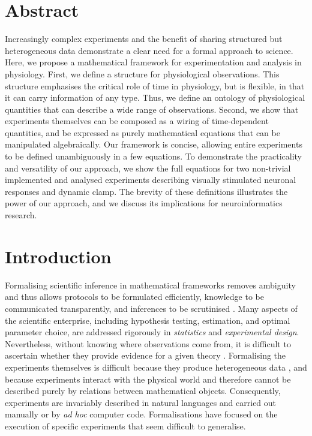 
\section*{Abstract}

Increasingly complex experiments and the benefit of sharing structured
but heterogeneous data demonstrate a clear need for a formal approach
to science.  Here, we propose a mathematical framework for
experimentation and analysis in physiology. First, we define a
structure for physiological observations. This structure emphasises
the critical role of time in physiology, but is flexible, in that it
can carry information of any type. Thus, we define an ontology of
physiological quantities that can describe a wide range of
observations. Second, we show that experiments themselves can be
composed as a wiring of time-dependent quantities, and be expressed as
purely mathematical equations that can be manipulated
algebraically. Our framework is concise, allowing entire experiments
to be defined unambiguously in a few equations. To demonstrate the
practicality and versatility of our approach, we show the full
equations for two non-trivial implemented and analysed experiments
describing visually stimulated neuronal responses and dynamic
clamp. The brevity of these definitions illustrates the power of our
approach, and we discuss its implications for neuroinformatics
research.

\section*{Introduction}

Formalising scientific inference in mathematical frameworks removes
ambiguity and thus allows protocols to be formulated efficiently,
knowledge to be communicated transparently, and inferences to be
scrutinised \citep{Soldatova2006, Jaynes2003, Krantz1971}. Many
aspects of the scientific enterprise, including hypothesis testing,
estimation, and optimal parameter choice, are addressed rigorously in
\emph{statistics} and \emph{experimental design}. Nevertheless,
without knowing where observations come from, it is difficult to
ascertain whether they provide evidence for a given theory
\citep{Pool2002,MacKenzie-Graham2008,VanHorn2009}. Formalising the
experiments themselves is difficult because they produce heterogeneous
data \citep{Tukey1962}, and because experiments interact with the
physical world and therefore cannot be described purely by relations
between mathematical objects. Consequently, experiments are invariably
described in natural languages and carried out manually or by \emph{ad
  hoc} computer code. Formalisations have focused on the execution of
specific experiments \citep{Jenkins1989, Manduchi1990, King2004} that
seem difficult to generalise.

